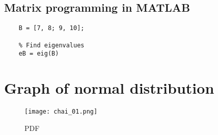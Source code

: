 \documentclass{article}
\begin{document}
\subsection{Matrix programming in MATLAB}
\begin{verbatim}
    B = [7, 8; 9, 10];
    
    % Find eigenvalues
    eB = eig(B)
\end{verbatim}

\section{Graph of normal distribution}
\begin{figure}[H]
\centering
\texttt{[image: chai\_01.png]}
\caption{PDF}
\label{fig:my_label}
\end{figure}
\end{document}
